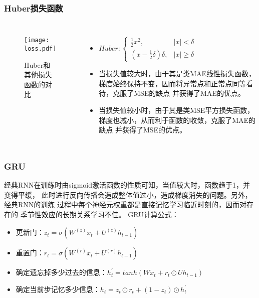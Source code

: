 \documentclass[14pt, AutoFakeBold]{ppt}
\begin{document}
\begin{frame}
  \frametitle{Huber损失函数}
  \begin{columns}
    \begin{figure}[H]
      \centering
      \texttt{[image: loss.pdf]}
      \caption{Huber和其他损失函数的对比}
      \label{fig_loss}
    \end{figure}
      \begin{itemize}
      \item $Huber:
      \left\{\begin{matrix}
          \frac{1}{2}x^{2}, & \left | x  \right | < \delta\\
          (x - \frac1 2 \delta)\delta, & \left | x  \right | \geq \delta
      \end{matrix}\right.$
      \item 当损失值较大时，由于其是类MAE线性损失函数，
      梯度始终保持不变，因而将异常点和正常点同等看待，克服了MSE的缺点
      并获得了MAE的优点。
      \item 当损失值较小时，由于其是类MSE平方损失函数，
      梯度也减小，从而利于函数的收敛，克服了MAE的缺点
      并获得了MSE的优点。
    \end{itemize}
  \end{columns}
\end{frame}

\begin{frame}
  \frametitle{GRU}
  经典RNN在训练时由sigmoid激活函数的性质可知，当值较大时，函数趋于1，并变得平缓，
  此时进行反向传播会造成整体值过小，造成梯度消失的问题。另外，经典RNN的训练
  过程中每个神经元权重都是直接记忆学习临近时刻的，因而对存在的
  季节性效应的长期关系学习不佳。
  \rightline{}
  GRU计算公式：
  \begin{itemize}
    \item 更新门：$z_t=\sigma(W^{(z)}x_t+U^{(z)}h_{t-1})$
    \item 重置门：$r_t=\sigma(W^{(r)}x_t+U^{(r)}h_{t-1})$
    \item 确定遗忘掉多少过去的信息：$h^{\prime}_t=tanh(Wx_t+r_t\odot Uh_{t-1})$
    \item 确定当前步记忆多少信息：$h_t=z_t\odot r_t+(1-z_t)\odot h^{\prime}_t$
  \end{itemize}
\end{frame}
\end{document}
